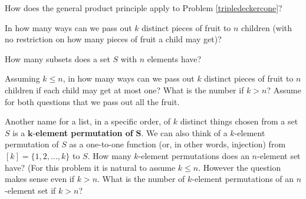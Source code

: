 

\items How does the general product principle apply to Problem
\ref{tripledeckercone}?

\iteme In how many ways can we pass out $k$ distinct pieces of
fruit to
$n$ children (with no restriction on how many pieces of fruit a child may
get)?  

\iteme \label{SubsetsFirstTime}How many subsets does a set $S$ with $n$ elements have?

\itemm  Assuming $k\le n$, in how many ways can we pass out  $k$
distinct pieces of fruit to
$n$ children if each child may get at most one?  What is the number if
$k>n$?  Assume for both questions that we pass out all the fruit.


\iteme Another name for a list, in a specific order, of $k$ distinct things
chosen from a set $S$ is a  $\mathbf k$-{\bf element permutation of}
$\mathbf S$.  We can also think of a $k$-element permutation of $S$ as a
one-to-one function (or, in other words, injection) from
$[k]=\{1,2,\ldots, k\}$ to $S$.  How many $k$-element permutations does an
$n$-element set have?\label{kelementpermutation}  (For this problem it is
natural to assume $k\le n$.  However the question makes sense even if $k>n$. 
What is the number of $k$-element permutations of an $n$-element set if $k>n$?
\ep


